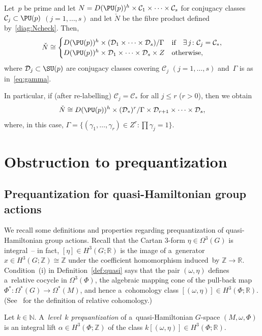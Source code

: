 \begin{Corollary}
\label{cor:PUpdecomp}
Let~$p$ be prime and let $N= D(\PU(p))^h \times \mathcal{C}_1 \times \dots \times \mathcal{C}_s $ for conjugacy classes
$\mathcal{C}_j \subset \PU(p)$ $(j=1,\ldots,s)$ and let $\check{N}$ be the fibre product defined by~\eqref{diag:Ncheck}.
Then,
\begin{gather*}
\check{N} \cong
\begin{cases}
D(\PU(p))^h \times (\mathcal{D}_1 \times \cdots \times \mathcal{D}_s)/{\Gamma} & \text{if}\quad\exists\, j \colon \mathcal{C}_j=\mathcal{C}_*,
\\
D(\PU(p))^h \times {\mathcal{D}_1 \times \cdots \times \mathcal{D}_s} \times Z & \text{otherwise},
\end{cases}
\end{gather*}
where $\mathcal{D}_j \subset \SU(p)$ are conjugacy classes covering $\mathcal{C}_j$ $(j=1,\ldots,s)$ and~$\Gamma$ is as
in~\eqref{eq:gamma}.
\end{Corollary}

In particular, if (after re-labelling) $\mathcal{C}_j=\mathcal{C}_*$ for all $j\leq r$ ($r>0$), then we obtain
\begin{gather}
\label{eq:splits4PUp}
\check{N} \cong D(\PU(p))^h \times (\mathcal{D}_*)^r/{\Gamma} \times \mathcal{D}_{r+1} \times \cdots \times
\mathcal{D}_s,
\end{gather}
where, in this case, $\Gamma=\{(\gamma_1, \ldots, \gamma_r) \in Z^r \colon \prod \gamma_j=1\}$.

\section{Obstruction to prequantization}\label{sec:main}

\subsection{Prequantization for quasi-Hamiltonian group actions}\label{sec:preq}

We recall some def\/initions and properties regarding prequantization of quasi-Hamiltonian group actions.
Recall that the Cartan $3$-form $\eta \in \Omega^3(G)$ is integral~-- in fact, $[\eta] \in H^3(G;{\mathbb{R}})$ is the
image of a~generator $x\in H^3(G;{\mathbb{Z}})\cong {\mathbb{Z}}$ under the coef\/f\/icient homomorphism induced~by
${\mathbb{Z}} \to {\mathbb{R}}$.
Condition~(i) %
in Def\/inition~\ref{def:quasi} says that the pair $(\omega,\eta)$ def\/ines a~relative
cocycle in $\Omega^3(\Phi)$, the algebraic mapping cone of the pull-back map $\Phi^*\colon \Omega^*(G)\to\Omega^*(M)$,
and hence a~cohomology class $[(\omega,\eta)] \in H^3(\Phi;{\mathbb{R}})$.
(See~\cite[Chapter~I, Section~6]{BottTu} for the def\/inition of relative cohomology.)
\begin{Definition}\label{preq}
Let $k\in {\mathbb{N}}$.
A~\emph{level~$k$ prequantization} of a~quasi-Hamiltonian $G$-space $(M,\omega,\Phi)$ is an integral lift $\alpha\in
H^3(\Phi;{\mathbb{Z}})$ of the class $k[(\omega,\eta)]\in H^3(\Phi;{\mathbb{R}})$.
\end{Definition}

